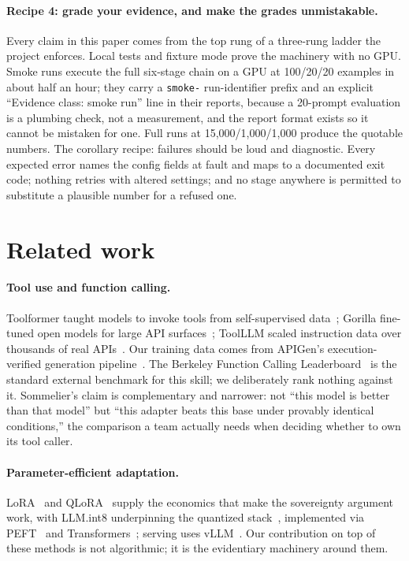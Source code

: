 \documentclass{article}
\newcommand{\sommelier}{Sommelier}
\begin{document}
\paragraph{Recipe 4: grade your evidence, and make the grades unmistakable.}
Every claim in this paper comes from the top rung of a three-rung ladder the project enforces. Local tests and fixture mode prove the machinery with no GPU. Smoke runs execute the full six-stage chain on a GPU at 100/20/20 examples in about half an hour; they carry a \texttt{smoke-} run-identifier prefix and an explicit ``Evidence class: smoke run'' line in their reports, because a 20-prompt evaluation is a plumbing check, not a measurement, and the report format exists so it cannot be mistaken for one. Full runs at 15{,}000/1{,}000/1{,}000 produce the quotable numbers. The corollary recipe: failures should be loud and diagnostic. Every expected error names the config fields at fault and maps to a documented exit code; nothing retries with altered settings; and no stage anywhere is permitted to substitute a plausible number for a refused one.

\section{Related work}
\label{sec:related}

\paragraph{Tool use and function calling.}
Toolformer taught models to invoke tools from self-supervised data~\citep{schick2023toolformer}; Gorilla fine-tuned open models for large API surfaces~\citep{patil2023gorilla}; ToolLLM scaled instruction data over thousands of real APIs~\citep{qin2023toolllm}. Our training data comes from APIGen's execution-verified generation pipeline~\citep{liu2024apigen}. The Berkeley Function Calling Leaderboard~\citep{patil2025bfcl} is the standard external benchmark for this skill; we deliberately rank nothing against it. \sommelier's claim is complementary and narrower: not ``this model is better than that model'' but ``this adapter beats this base under provably identical conditions,'' the comparison a team actually needs when deciding whether to own its tool caller.

\paragraph{Parameter-efficient adaptation.}
LoRA~\citep{hu2021lora} and QLoRA~\citep{dettmers2023qlora} supply the economics that make the sovereignty argument work, with LLM.int8 underpinning the quantized stack~\citep{dettmers2022llmint8}, implemented via PEFT~\citep{mangrulkar2022peft} and Transformers~\citep{wolf2019transformers}; serving uses vLLM~\citep{kwon2023vllm}. Our contribution on top of these methods is not algorithmic; it is the evidentiary machinery around them.
\end{document}
